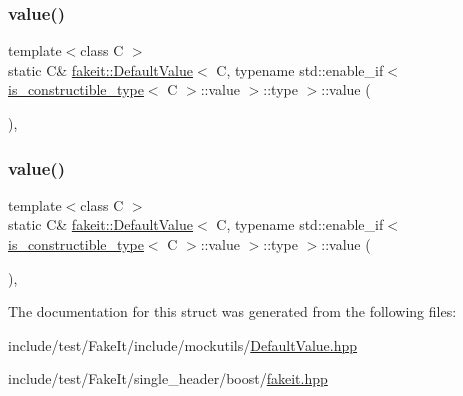 \subsubsection{\texorpdfstring{value()}{value()}\hspace{0.1cm}{\footnotesize\ttfamily [8/9]}}
{\footnotesize\ttfamily template$<$class C $>$ \\
static C\& \mbox{\hyperlink{structfakeit_1_1DefaultValue}{fakeit\+::\+Default\+Value}}$<$ C, typename std\+::enable\+\_\+if$<$ \mbox{\hyperlink{structfakeit_1_1is__constructible__type}{is\+\_\+constructible\+\_\+type}}$<$ C $>$\+::value $>$\+::type $>$\+::value (\begin{DoxyParamCaption}{ }\end{DoxyParamCaption})\hspace{0.3cm}{\ttfamily [inline]}, {\ttfamily [static]}}

\mbox{\label{structfakeit_1_1DefaultValue_3_01C_00_01typename_01std_1_1enable__if_3_01is__constructible__typeba4172eb6f54b4f010948e5b77fe8b8f_ae142b421f47b7029f531c0a996e876e7}} 
\subsubsection{\texorpdfstring{value()}{value()}\hspace{0.1cm}{\footnotesize\ttfamily [9/9]}}
{\footnotesize\ttfamily template$<$class C $>$ \\
static C\& \mbox{\hyperlink{structfakeit_1_1DefaultValue}{fakeit\+::\+Default\+Value}}$<$ C, typename std\+::enable\+\_\+if$<$ \mbox{\hyperlink{structfakeit_1_1is__constructible__type}{is\+\_\+constructible\+\_\+type}}$<$ C $>$\+::value $>$\+::type $>$\+::value (\begin{DoxyParamCaption}{ }\end{DoxyParamCaption})\hspace{0.3cm}{\ttfamily [inline]}, {\ttfamily [static]}}



The documentation for this struct was generated from the following files\+:\begin{DoxyCompactItemize}
\item 
include/test/\+Fake\+It/include/mockutils/\mbox{\hyperlink{DefaultValue_8hpp}{Default\+Value.\+hpp}}\item 
include/test/\+Fake\+It/single\+\_\+header/boost/\mbox{\hyperlink{single__header_2boost_2fakeit_8hpp}{fakeit.\+hpp}}\end{DoxyCompactItemize}
